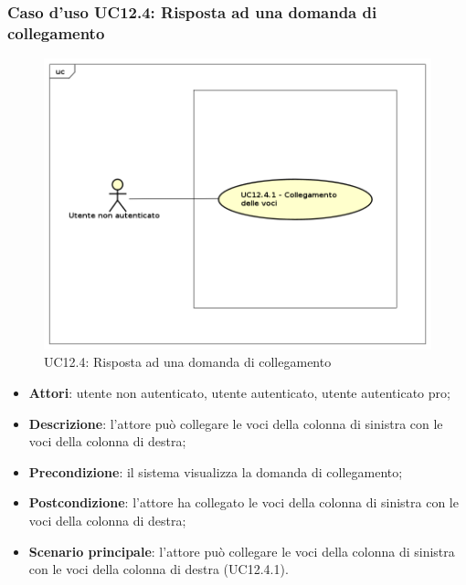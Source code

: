 \subsubsection{Caso d'uso UC12.4: Risposta ad una domanda di collegamento}
\begin{figure}[h]
	\centering
	\includegraphics[scale=0.5]{UML/UC12_4.png}
	\caption{UC12.4: Risposta ad una domanda di collegamento}
\end{figure}
\begin{itemize}
\item \textbf{Attori}: utente non autenticato, utente autenticato, utente autenticato pro;
\item \textbf{Descrizione}: l'attore può collegare le voci della colonna di sinistra con le voci della colonna di destra;
\item \textbf{Precondizione}: il sistema visualizza la domanda di collegamento;
\item \textbf{Postcondizione}: l'attore ha collegato le voci della colonna di sinistra con le voci della colonna di destra;
\item \textbf{Scenario principale}: l'attore può collegare le voci della colonna di sinistra con le voci della colonna di destra (UC12.4.1).
\end{itemize}

\newpage
